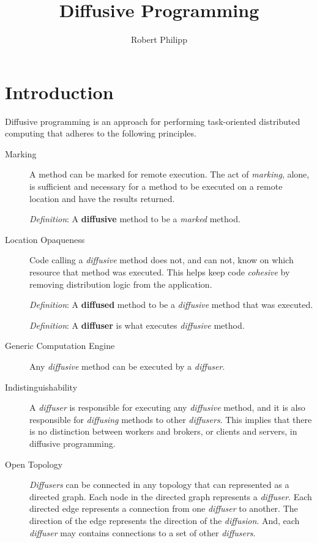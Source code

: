 \documentclass[11pt]{amsart}
\title{Diffusive Programming}
\author{Robert Philipp}
\date{}                                           %
\begin{document}
\maketitle
\section{Introduction}
Diffusive programming is an approach for performing task-oriented distributed computing that adheres to the following principles.
\begin{description}

	\item[Marking] 
	A method can be marked for remote execution. The act of \emph{marking}, alone, is sufficient and necessary for a method to be executed on a remote location and have the results returned. 
	
	\emph{Definition}: A \textbf{diffusive} method to be a \emph{marked} method.

	\item[Location Opaqueness]
	Code calling a \emph{diffusive} method does not, and can not, know on which resource that method was executed. This helps keep code \emph{cohesive} by removing distribution logic from the application. 
	
	\emph{Definition}: A \textbf{diffused} method to be a \emph{diffusive} method that was executed. 
	
	\emph{Definition}: A \textbf{diffuser} is what executes \emph{diffusive} method.
	
	\item[Generic Computation Engine]
	Any \emph{diffusive} method can be executed by a \emph{diffuser}.
	
	\item[Indistinguishability]
	A \emph{diffuser} is responsible for executing any \emph{diffusive} method, and it is also responsible for \emph{diffusing} methods to other \emph{diffusers}. This implies that there is no distinction between workers and brokers, or clients and servers, in diffusive programming.
	
	\item[Open Topology]
	\emph{Diffusers} can be connected in any topology that can represented as a directed graph. Each node in the directed graph represents a \emph{diffuser}. Each directed edge represents a connection from one \emph{diffuser} to another. The direction of the edge represents the direction of the \emph{diffusion}. And, each \emph{diffuser} may contains connections to a set of other \emph{diffusers}. 
	

\end{description}
\end{document}
